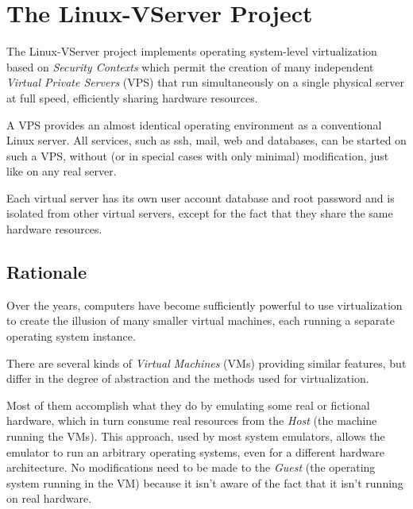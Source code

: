 \chapter{The Linux-VServer Project}
\label{ch:intro:vserver}



The Linux-VServer project implements operating system-level virtualization
based on \textit{Security Contexts} which permit the creation of many
independent \textit{Virtual Private Servers} (VPS) that run simultaneously on a
single physical server at full speed, efficiently sharing hardware resources.

A VPS provides an almost identical operating environment as a conventional
Linux server. All services, such as ssh, mail, web and databases, can be
started on such a VPS, without (or in special cases with only minimal)
modification, just like on any real server.

Each virtual server has its own user account database and root password and is
isolated from other virtual servers, except for the fact that they share the
same hardware resources.


\section{Rationale}
\label{sec:intro:vserver:rationale}

Over the years, computers have become sufficiently powerful to use
virtualization to create the illusion of many smaller virtual machines, each
running a separate operating system instance.

There are several kinds of \textit{Virtual Machines} (VMs) providing similar
features, but differ in the degree of abstraction and the methods used for
virtualization.

Most of them accomplish what they do by emulating some real or fictional
hardware, which in turn consume real resources from the \textit{Host} (the
machine running the VMs). This approach, used by most system emulators, allows
the emulator to run an arbitrary operating systems, even for a different
hardware architecture. No modifications need to be made to the \textit{Guest}
(the operating system running in the VM) because it isn't aware of the fact
that it isn't running on real hardware.

